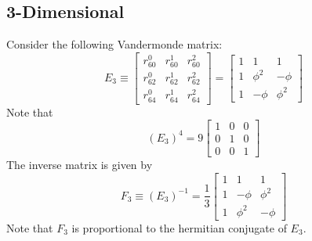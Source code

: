 \subsection{3-Dimensional}
Consider the following Vandermonde matrix:
\begin{equation}
    E_{3} \equiv \begin{bmatrix}
        r_{60}^{0} & r_{60}^{1} & r_{60}^{2} \\
        r_{62}^{0} & r_{62}^{1} & r_{62}^{2} \\
        r_{64}^{0} & r_{64}^{1} & r_{64}^{2}
    \end{bmatrix} = \begin{bmatrix}
        1 & 1 & 1 \\
        1 & \phi^{2} & -\phi \\
        1 & -\phi & \phi^{2}
    \end{bmatrix}
    \label{eq.2.E3}
\end{equation}
Note that
\begin{equation}
    \left( E_{3} \right)^{4} = 9 \begin{bmatrix}
        1 & 0 & 0 \\
        0 & 1 & 0 \\
        0 & 0 & 1
    \end{bmatrix}
\end{equation}
The inverse matrix is given by
\begin{equation}
    F_{3} \equiv \left( E_{3} \right)^{-1} = \frac{1}{3} \begin{bmatrix}
        1 & 1 & 1 \\
        1 & -\phi & \phi^{2} \\
        1 & \phi^{2} & -\phi
    \end{bmatrix}
    \label{eq.2.F3}
\end{equation}
Note that $F_{3}$ is proportional to the hermitian conjugate of $E_{3}$.

